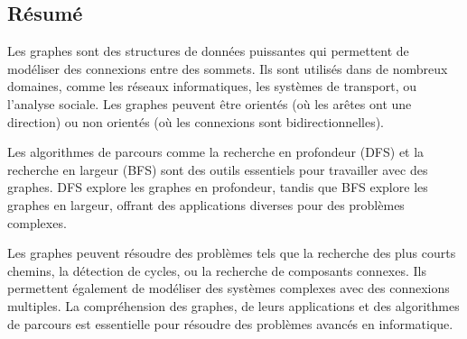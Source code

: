 \subsection{Résumé}

Les graphes sont des structures de données puissantes qui permettent de modéliser des connexions entre des sommets. Ils sont utilisés dans de nombreux domaines, comme les réseaux informatiques, les systèmes de transport, ou l'analyse sociale. Les graphes peuvent être orientés (où les arêtes ont une direction) ou non orientés (où les connexions sont bidirectionnelles).

Les algorithmes de parcours comme la recherche en profondeur (DFS) et la recherche en largeur (BFS) sont des outils essentiels pour travailler avec des graphes. DFS explore les graphes en profondeur, tandis que BFS explore les graphes en largeur, offrant des applications diverses pour des problèmes complexes.

Les graphes peuvent résoudre des problèmes tels que la recherche des plus courts chemins, la détection de cycles, ou la recherche de composants connexes. Ils permettent également de modéliser des systèmes complexes avec des connexions multiples. La compréhension des graphes, de leurs applications et des algorithmes de parcours est essentielle pour résoudre des problèmes avancés en informatique.



